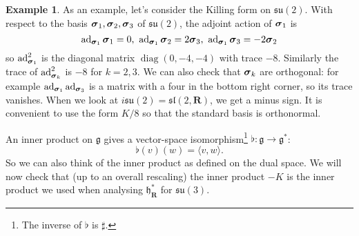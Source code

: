 \documentclass[12pt]{article}
\renewcommand\vec[1]{\ensuremath\boldsymbol{#1}}
\newcommand{\RR}{\mathbf{R}}
\newcommand{\OP}{\operatorname}
\newcommand{\ad}{\OP{ad}}
\theoremstyle{definition}
\newtheorem{exm}[thm]{Example}
\theoremstyle{check}
\theoremstyle{remark}
\theoremstyle{TheoremNum}
\begin{document}
\begin{exm}
As an example, let's consider the Killing form on $\mathfrak{su}(2)$. With respect to the basis $\vec{\sigma}_1,\vec{\sigma}_2,\vec{\sigma}_3$ of $\mathfrak{su}(2)$, the adjoint action of $\vec{\sigma}_1$ is
\[\ad_{\vec{\sigma}_1}\vec{\sigma}_1=0,\ \ad_{\vec{\sigma}_1}\vec{\sigma}_2=2\vec{\sigma}_3,\ \ad_{\vec{\sigma}_1}\vec{\sigma}_3=-2\vec{\sigma}_2\]
so $\ad_{\vec{\sigma}_1}^2$ is the diagonal matrix $\OP{diag}(0,-4,-4)$ with trace $-8$. Similarly the trace of $\ad_{\vec{\sigma}_k}^2$ is $-8$ for $k=2,3$. We can also check that $\vec{\sigma}_k$ are orthogonal: for example $\ad_{\vec{\sigma}_1}\ad_{\vec{\sigma}_3}$ is a matrix with a four in the bottom right corner, so its trace vanishes. When we look at $i\mathfrak{su}(2)=\mathfrak{sl}(2,\RR)$, we get a minus sign. It is convenient to use the form $K/8$ so that the standard basis is orthonormal.
\end{exm}
An inner product on $\mathfrak{g}$ gives a vector-space isomorphism\footnote{The inverse of $\flat$ is $\sharp$.} $\flat\colon\mathfrak{g}\to\mathfrak{g}^*$:
\[\flat(v)(w)=\langle v,w\rangle.\]
So we can also think of the inner product as defined on the dual space. We will now check that (up to an overall rescaling) the inner product $-K$ is the inner product we used when analysing $\mathfrak{h}^*_\RR$ for $\mathfrak{su}(3)$.
\end{document}
